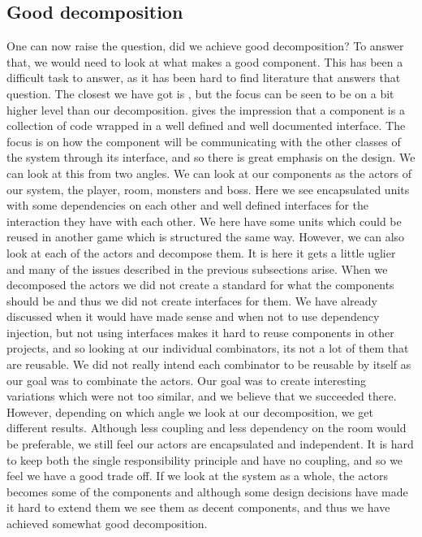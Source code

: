 \subsection{Good decomposition}
One can now raise the question, did we achieve good decomposition? To answer that, we would need to look at what makes a good component. This has been a difficult task to answer, as it has been hard to find literature that answers that question. The closest we have got is \cite{Components}, but the focus can be seen to be on a bit higher level than our decomposition. \cite{Components} gives the impression that a component is a collection of code wrapped in a well defined and well documented interface. The focus is on how the component will be communicating with the other classes of the system through its interface, and so there is great emphasis on the design. We can look at this from two angles. We can look at our components as the actors of our system, the player, room, monsters and boss. Here we see encapsulated units with some dependencies on each other and well defined interfaces for the interaction they have with each other. We here have some units which could be reused in another game which is structured the same way. However, we can also look at each of the actors and decompose them. It is here it gets a little uglier and many of the issues described in the previous subsections arise. When we decomposed the actors we did not create a standard for what the components should be and thus we did not create interfaces for them. We have already discussed when it would have made sense and when not to use dependency injection, but not using interfaces makes it hard to reuse components in other projects, and so looking at our individual combinators, its not a lot of them that are reusable. We did not really intend each combinator to be reusable by itself as our goal was to combinate the actors. Our goal was to create interesting variations which were not too similar, and we believe that we succeeded there. However, depending on which angle we look at our decomposition, we get different results. Although less coupling and less dependency on the room would be preferable, we still feel our actors are encapsulated and independent. It is hard to keep both the single responsibility principle and have no coupling, and so we feel we have a good trade off. If we look at the system as a whole, the actors becomes some of the components and although some design decisions have made it hard to extend them we see them as decent components, and thus we have achieved somewhat good decomposition.\\
